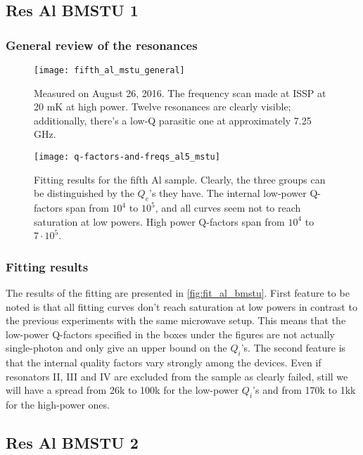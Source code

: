 \documentclass[12pt]{article}
\numberwithin{equation}{section}
\numberwithin{figure}{section}
\begin{document}
\subsection{Res Al BMSTU 1}


\subsubsection{General review of the resonances}

\begin{figure}[h!]
\centering
\texttt{[image: fifth\_al\_mstu\_general]}
\caption{Measured on August 26, 2016. The frequency scan made at ISSP at 20 mK at high power. Twelve resonances are clearly visible; additionally, there's a low-Q parasitic one at approximately 7.25 GHz.}
\end{figure}

\begin{figure}
\centering
\vspace*{-1cm}
\texttt{[image: q-factors-and-freqs\_al5\_mstu]}
\caption{Fitting results for the fifth Al sample. Clearly, the three groups can be distinguished by the $Q_e$'s they have. The internal low-power Q-factors span from $10^4$ to $10^5$, and all curves seem not to reach saturation at low powers. High power Q-factors span from $10^4$ to $7\cdot10^5$.}
\label{fig:fit_al_bmstu}
\end{figure}

\subsubsection{Fitting results}

The results of the fitting are presented in \autoref{fig:fit_al_bmstu}. First feature to be noted is that all fitting curves don't reach saturation at low powers in contrast to the previous experiments with the same microwave setup. This means that the low-power Q-factors specified in the boxes under the figures are not actually single-photon and only give an upper bound on the $Q_i$'s. The second feature is that the internal quality factors vary strongly among the devices. Even if resonators II, III and IV are excluded from the sample as clearly failed, still we will have a spread from 26k to 100k for the low-power $Q_i$'s and from 170k to 1kk for the high-power ones.

\subsection{Res Al BMSTU 2}
\end{document}
